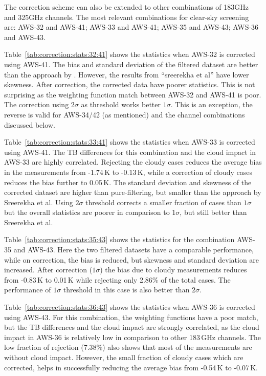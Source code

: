\documentclass[12pt]{article}
\begin{document}
The correction scheme can also be extended to other combinations of 183GHz and
325GHz channels. The most relevant combinations for clear-sky screening are: AWS-32 and
AWS-41; AWS-33 and AWS-41; AWS-35 and AWS-43; AWS-36 and AWS-43.

Table~\ref{tab:correction:stats:32:41} shows the statistics when AWS-32 is
corrected using AWS-41. The bias and standard deviation of the filtered dataset are better than
the approach by \cite{rekha2012potential}. However, the results from ``sreerekha et al'' have lower skewness. After correction, the corrected data have poorer
statistics. This is not surprising as the weighting function match between
AWS-32 and AWS-41 is poor. The correction using $2\sigma$ as threshold works
better $1\sigma$. This is an exception, the reverse is valid for AWS-34/42 (as
mentioned) and the channel combinations discussed below.

Table~\ref{tab:correction:stats:33:41} shows the statistics when AWS-33 is
corrected using AWS-41. The TB differences for this combination and the cloud
impact in AWS-33 are highly correlated. Rejecting the cloudy cases reduces the
average bias in the measurements from -1.74\,K to -0.13\,K, while a correction
of cloudy cases reduces the bias further to 0.05\,K. The standard deviation and
skewness of the corrected dataset are higher than pure-filtering, but smaller
than the approach by Sreerekha et al. Using $2\sigma$ threshold corrects a
smaller fraction of cases than $1\sigma$ but the overall statistics are poorer
in comparison to $1\sigma$, but still better than Sreerekha et al.

Table~\ref{tab:correction:stats:35:43} shows the statistics for the combination AWS-35 and AWS-43. Here the two filtered datasets have a comparable performance, while on correction, the bias is reduced, but skewness and standard deviation are increased. After correction ($1\sigma$) the bias due to cloudy measurements reduces from -0.83\,K to 0.01\,K while rejecting only 2.86\% of the total cases.  The performance of $1\sigma$ threshold in this case is also better than $2\sigma$.  
 
 
Table~\ref{tab:correction:stats:36:43} shows the statistics when AWS-36 is
corrected using AWS-43. For this combination, the weighting functions have a
poor match, but the TB differences and the cloud impact are strongly
correlated, as the cloud impact in AWS-36 is relatively low in comparison to
other 183\,GHz channels. The low fraction of rejection (7.38\%) also shows that
most of the measurements are without cloud impact. However, the small fraction
of cloudy cases which are corrected, helps in successfully reducing the average
bias from -0.54\,K to -0.07\,K.
\end{document}
